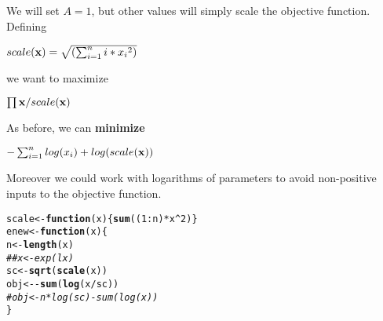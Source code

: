 \documentclass[11pt]{article}\usepackage[]{graphicx}\usepackage[]{color}
\makeatletter
\newcommand{\hlnum}[1]{\textcolor[rgb]{0.686,0.059,0.569}{#1}}%
\newcommand{\hlcom}[1]{\textcolor[rgb]{0.678,0.584,0.686}{\textit{#1}}}%
\newcommand{\hlopt}[1]{\textcolor[rgb]{0,0,0}{#1}}%
\newcommand{\hlstd}[1]{\textcolor[rgb]{0.345,0.345,0.345}{#1}}%
\newcommand{\hlkwa}[1]{\textcolor[rgb]{0.161,0.373,0.58}{\textbf{#1}}}%
\newcommand{\hlkwb}[1]{\textcolor[rgb]{0.69,0.353,0.396}{#1}}%
\newcommand{\hlkwc}[1]{\textcolor[rgb]{0.333,0.667,0.333}{#1}}%
\newcommand{\hlkwd}[1]{\textcolor[rgb]{0.737,0.353,0.396}{\textbf{#1}}}%
\newenvironment{kframe}{%
 \def\at@end@of@kframe{}%
 \ifinner\ifhmode%
  \def\at@end@of@kframe{\end{minipage}}%
  \begin{minipage}{\columnwidth}%
 \fi\fi%
 \def\FrameCommand##1{\hskip\@totalleftmargin \hskip-\fboxsep
 \colorbox{shadecolor}{##1}\hskip-\fboxsep
     \hskip-\linewidth \hskip-\@totalleftmargin \hskip\columnwidth}%
 \MakeFramed {\advance\hsize-\width
   \@totalleftmargin\z@ \linewidth\hsize
   \@setminipage}}%
 {\par\unskip\endMakeFramed%
 \at@end@of@kframe}
\newenvironment{knitrout}{}{} %
\newcommand{\B}[1]{{\bf #1 \rm}}
\makeatother
\begin{document}
We will set $A = 1$, but other values will simply scale the objective function.
Defining 

$ scale({\B{x})} = \sqrt{(\sum_{i=1}^n{i*{x_i}^2})}  $

we want to maximize 

$ \prod{\B{x}} / scale({\B{x})} $

As before, we can \B{minimize}

$  - \sum_{i=1}^n{log(x_i)} + log(scale({\B{x})}) $

Moreover we could work with logarithms of parameters to avoid non-positive inputs to the objective function.


\begin{knitrout}\scriptsize
{}\color{fgcolor}\begin{kframe}
\begin{alltt}
\hlstd{scale} \hlkwb{<-} \hlkwa{function}\hlstd{(}\hlkwc{x}\hlstd{) \{}\hlkwd{sum}\hlstd{( (}\hlnum{1}\hlopt{:}\hlstd{n)} \hlopt{*} \hlstd{x}\hlopt{^}\hlnum{2}\hlstd{)\}}
\hlstd{enew} \hlkwb{<-} \hlkwa{function}\hlstd{(}\hlkwc{x}\hlstd{)\{}
  \hlstd{n} \hlkwb{<-} \hlkwd{length}\hlstd{(x)}
\hlcom{##  x <- exp(lx)}
  \hlstd{sc} \hlkwb{<-} \hlkwd{sqrt}\hlstd{(}\hlkwd{scale}\hlstd{(x))}
  \hlstd{obj} \hlkwb{<-} \hlopt{-} \hlkwd{sum}\hlstd{(}\hlkwd{log}\hlstd{(x}\hlopt{/}\hlstd{sc))}
\hlcom{#  obj <- n*log(sc)-sum(log(x))}
\hlstd{\}}
\end{alltt}
\end{kframe}
\end{knitrout}
\end{document}

